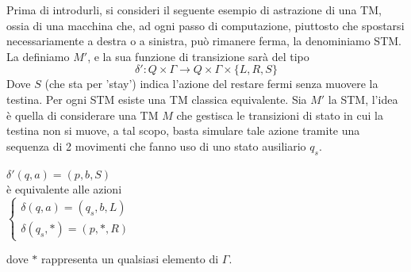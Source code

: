 \documentclass[10pt, letterpaper]{report}
\begin{document}
Prima di introdurli, si consideri il seguente esempio di 
astrazione di una TM, ossia di una macchina che, ad ogni passo di 
computazione, piuttosto che spostarsi necessariamente a destra o 
a sinistra, può rimanere ferma, la denominiamo STM. \acc 
La definiamo $M'$, e la sua funzione di transizione sarà del tipo 
$$ \delta':Q\times\Gamma \rightarrow Q\times\Gamma\times \{L,R,S\}$$
Dove $S$ (che sta per 'stay') indica l'azione del restare fermi senza 
muovere la testina.\acc 
\prop{} Per ogni STM esiste una TM classica equivalente. \acc 
\dimo{} Sia $M'$ la STM, l'idea è quella di considerare una TM $M$ 
che gestisca le transizioni di stato in cui la testina 
non si muove, a tal scopo, basta simulare tale azione tramite 
una sequenza di 2 movimenti che fanno uso di uno stato ausiliario $q_s$. 
\begin{center}
    $ \delta'(q,a)=(p,b,S)$
    \\ è equivalente alle azioni \\ 
    $\begin{cases}
        \delta(q,a)=(q_s,b,L)\\ 
        \delta(q_s,*)=(p,*,R)
        
    \end{cases}$
\end{center}
dove $*$ rappresenta un qualsiasi elemento di $\Gamma$.
\end{document}
